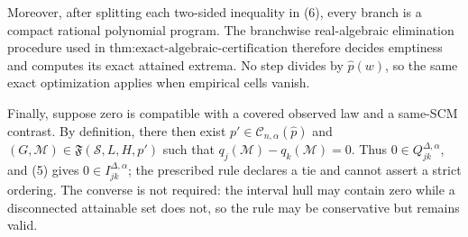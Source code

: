 Moreover, after splitting each two-sided inequality in (6), every branch is a compact rational polynomial program.  The branchwise real-algebraic elimination procedure used in \(\text{thm:exact-algebraic-certification}\) therefore decides emptiness and computes its exact attained extrema.  No step divides by \(\widehat p(w)\), so the same exact optimization applies when empirical cells vanish.

Finally, suppose zero is compatible with a covered observed law and a same-SCM contrast.  By definition, there then exist \(p'\in\mathcal C_{n,\alpha}(\widehat p)\) and \((G,\mathcal M)\in\mathfrak F(\mathcal S,L,H,p')\) such that \(q_j(\mathcal M)-q_k(\mathcal M)=0\).  Thus \(0\in Q_{jk}^{\Delta,\alpha}\), and (5) gives \(0\in I_{jk}^{\Delta,\alpha}\); the prescribed rule declares a tie and cannot assert a strict ordering.  The converse is not required: the interval hull may contain zero while a disconnected attainable set does not, so the rule may be conservative but remains valid.
